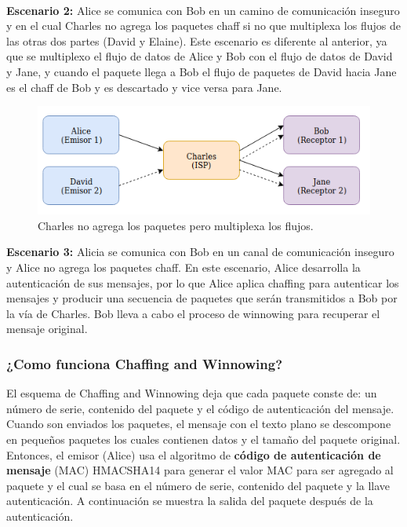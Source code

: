\documentclass[12pt, a4paper, titlepage]{article}
\begin{document}
		\paragraph{}
		\textbf{Escenario 2:} Alice se comunica con Bob en un camino de comunicación inseguro y en el cual Charles no agrega los paquetes chaff si no que multiplexa los flujos de las otras dos partes (David y Elaine). Este escenario es diferente al anterior, ya que se multiplexo el flujo de datos de Alice y Bob con el flujo de datos de David y Jane, y cuando el paquete llega a Bob el flujo de paquetes de David hacia Jane es el chaff de Bob y es descartado y vice versa para Jane.
		
		\begin{figure}[H]
			\begin{center}	                  \includegraphics[width=14cm]{./imagenes/escenario2.png}
				\caption{Charles no agrega los paquetes pero multiplexa los flujos.}
			\end{center}
		\end{figure}
		
		\newpage
		\textbf{Escenario 3:} Alicia se comunica con Bob en un canal de comunicación inseguro y Alice no agrega los paquetes chaff. En este escenario, Alice desarrolla la autenticación de sus mensajes, por lo que Alice aplica chaffing para autenticar los mensajes y producir una secuencia de paquetes que serán transmitidos a Bob por la vía de Charles. Bob lleva a cabo el proceso de winnowing para recuperar el mensaje original.

		\subsubsection{¿Como funciona Chaffing and Winnowing?}
		
		El esquema de Chaffing and Winnowing deja que cada paquete conste de: un número de serie, contenido del paquete y el código de autenticación del mensaje.
		Cuando son enviados los paquetes, el mensaje con el texto plano se descompone en pequeños paquetes los cuales contienen datos y el tamaño del paquete original. Entonces, el emisor (Alice) usa el algoritmo de \textbf{código de autenticación de mensaje} (MAC) \Gls{HMACSHA14} para generar el valor MAC para ser agregado al paquete y el cual se basa en el número de serie, contenido del paquete y la llave autenticación. A continuación se muestra la salida del paquete después de la autenticación.
		
\end{document}
